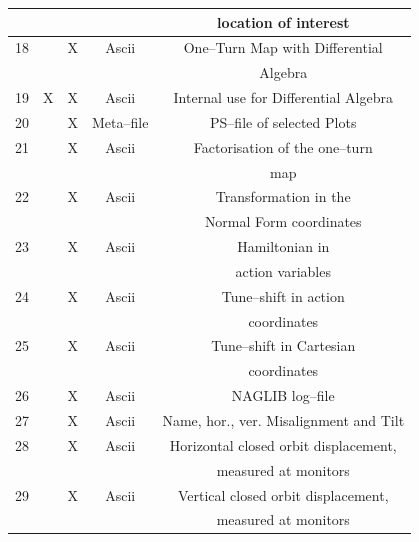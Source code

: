 \documentclass[a4paper,11pt]{report}
\begin{document}
\begin{center}
\begin{longtable}{|c|c|c|c|c|}
  \rule[-3.7mm]{0mm}{7.5mm}
  & & & & location of interest \\
  \hline \rule[-1.25mm]{0mm}{7.5mm}
  18 & & X & Ascii & One--Turn Map with Differential \\*
  \rule[-3.7mm]{0mm}{7.5mm}
  & & & & Algebra \\
  \hline \rule[-3.75mm]{0mm}{10mm}
  19 & X & X & Ascii & Internal use for Differential Algebra \\
  \hline \rule[-3.75mm]{0mm}{10mm}
  20 & & X & Meta--file & PS--file of selected Plots \\
  \hline \rule[-1.25mm]{0mm}{7.5mm}
  21 & & X & Ascii & Factorisation of the one--turn \\*
  \rule[-3.7mm]{0mm}{7.5mm}
  & & & & map \\
  \hline \rule[-1.25mm]{0mm}{7.5mm}
  22 & & X & Ascii & Transformation in the \\*
  \rule[-3.7mm]{0mm}{7.5mm}
  & & & & Normal Form coordinates \\
  \hline \rule[-1.25mm]{0mm}{7.5mm}
  23 & & X & Ascii & Hamiltonian in \\*
  \rule[-3.7mm]{0mm}{7.5mm}
  & & & & action variables \\
  \hline \rule[-1.25mm]{0mm}{7.5mm}
  24 & & X & Ascii & Tune--shift in action \\*
  \rule[-3.7mm]{0mm}{7.5mm}
  & & & & coordinates \\
  \hline \rule[-1.25mm]{0mm}{7.5mm}
  25 & & X & Ascii & Tune--shift in Cartesian \\*
  \rule[-3.7mm]{0mm}{7.5mm}
  & & & & coordinates \\
  \hline \rule[-3.75mm]{0mm}{10mm}
  26 & & X & Ascii & NAGLIB log--file \\
  \hline \rule[-3.75mm]{0mm}{10mm}
  27 & & X & Ascii & Name, hor., ver. Misalignment and Tilt \\
  \hline \rule[-1.75mm]{0mm}{10mm}
  28 & & X & Ascii & Horizontal closed orbit displacement, \\*
  \rule[-3.7mm]{0mm}{7.5mm}
  & &   &       & measured at monitors \\
  \hline \rule[-1.75mm]{0mm}{10mm}
  29 & & X & Ascii & Vertical closed orbit displacement, \\*
  \rule[-3.7mm]{0mm}{7.5mm}
  & &   &       & measured at monitors \\

\end{longtable}
\end{center}
\end{document}
